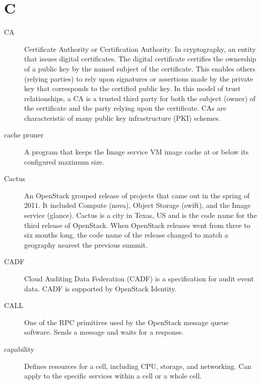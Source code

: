 \documentclass[letterpaper,10pt,english]{sphinxmanual}
\begin{document}
\section{C}
\label{_source/glossary:c}\begin{description}
\item[{CA}] \leavevmode{}\label{_source/glossary:term-ca}
Certificate Authority or Certification Authority. In
cryptography, an entity that issues digital certificates. The digital
certificate certifies the ownership of a public key by the named
subject of the certificate. This enables others (relying parties) to
rely upon signatures or assertions made by the private key that
corresponds to the certified public key. In this model of trust
relationships, a CA is a trusted third party for both the subject
(owner) of the certificate and the party relying upon the certificate.
CAs are characteristic of many public key infrastructure (PKI)
schemes.

\item[{cache pruner}] \leavevmode{}\label{_source/glossary:term-cache-pruner}
A program that keeps the Image service VM image cache at or
below its configured maximum size.

\item[{Cactus}] \leavevmode{}\label{_source/glossary:term-cactus}
An OpenStack grouped release of projects that came out in the
spring of 2011. It included Compute (nova), Object Storage (swift),
and the Image service (glance).
Cactus is a city in Texas, US and is the code name for
the third release of OpenStack. When OpenStack releases went
from three to six months long, the code name of the release
changed to match a geography nearest the previous
summit.

\item[{CADF}] \leavevmode{}\label{_source/glossary:term-cadf}
Cloud Auditing Data Federation (CADF) is a
specification for audit event data. CADF is
supported by OpenStack Identity.

\item[{CALL}] \leavevmode{}\label{_source/glossary:term-call}
One of the RPC primitives used by the OpenStack message queue
software. Sends a message and waits for a response.

\item[{capability}] \leavevmode{}\label{_source/glossary:term-capability}
Defines resources for a cell, including CPU, storage, and
networking. Can apply to the specific services within a cell or a
whole cell.


\end{description}
\end{document}
